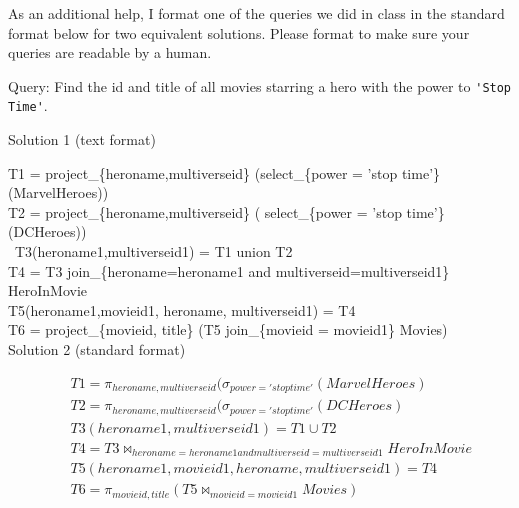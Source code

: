 \documentclass[11pt]{article}
\begin{document}
As an additional help, I format one of the queries we did in class in
the standard format below for two equivalent solutions. Please format
to make sure your queries are readable by a human.

Query: Find the id and title of all movies starring a hero with the
power to \verb+'Stop Time'+.

Solution 1 (text format)

T1 = project\_\{heroname,multiverseid\} (select\_\{power = 'stop time'\}(MarvelHeroes)) \\
T2 = project\_\{heroname,multiverseid\} ( select\_\{power = 'stop time'\}(DCHeroes)) \\\
T3(heroname1,multiverseid1) = T1 union T2 \\
T4 = T3 join\_\{heroname=heroname1 and multiverseid=multiverseid1\} HeroInMovie \\
T5(heroname1,movieid1, heroname, multiverseid1)  = T4 \\
T6 = project\_\{movieid, title\} (T5 join\_\{movieid = movieid1\} Movies) \\


Solution 2 (standard format)

\begin{eqnarray*}
& & T1 = \pi_{heroname,multiverseid} (\sigma_{power = 'stop time'}(MarvelHeroes) \\
& & T2 = \pi_{heroname,multiverseid} (\sigma_{power = 'stop time'}(DCHeroes) \\
& & T3(heroname1,multiverseid1) = T1 \cup T2 \\
& & T4 = T3 \bowtie_{heroname=heroname1 and multiverseid=multiverseid1} HeroInMovie \\
& & T5(heroname1,movieid1, heroname, multiverseid1)  = T4 \\
& & T6 = \pi_{movieid, title} (T5 \bowtie_{movieid = movieid1} Movies)
\end{eqnarray*}
\end{document}

